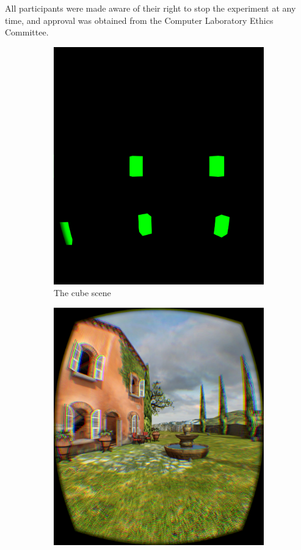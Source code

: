 \documentclass[12pt,a4paper,twoside,openright]{report}
\begin{document}
\noindent All participants were made aware of their right to stop the experiment at any time, and approval was obtained from the Computer Laboratory Ethics Committee. 

\begin{figure}[tbh]
\begin{centering}
\begin{subfigure}{0.3\textwidth}
\includegraphics[width=0.9\linewidth]{figs/cubes.png}
\caption{The cube scene}
\end{subfigure}
\begin{subfigure}{0.3\textwidth}
\includegraphics[width=0.9\linewidth]{figs/noantialiasing.png}

\end{subfigure}
\end{centering}
\end{figure}
\end{document}
